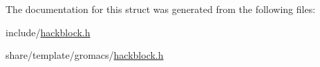 \-The documentation for this struct was generated from the following files\-:\begin{DoxyCompactItemize}
\item 
include/\hyperlink{include_2hackblock_8h}{hackblock.\-h}\item 
share/template/gromacs/\hyperlink{share_2template_2gromacs_2hackblock_8h}{hackblock.\-h}\end{DoxyCompactItemize}
